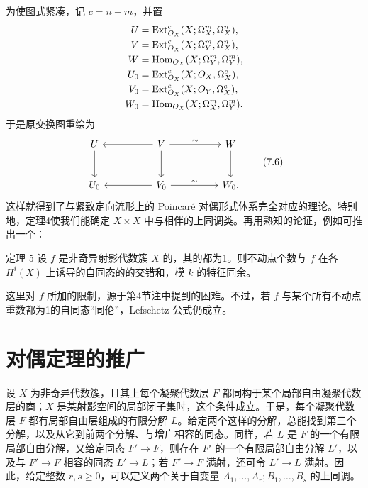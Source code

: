 为使图式紧凑，记 $c=n-m$，并置
\[
\begin{aligned}
U&=\operatorname{Ext}_{O_X}^{c}(X;\Omega_X^m,\Omega_X^n),\\
V&=\operatorname{Ext}_{O_X}^{c}(X;\Omega_Y^m,\Omega_X^n),\\
W&=\operatorname{Hom}_{O_X}(X;\Omega_Y^m,\Omega_Y^m),\\
U_0&=\operatorname{Ext}_{O_X}^{c}(X;O_X,\Omega_X^c),\\
V_0&=\operatorname{Ext}_{O_X}^{c}(X;O_Y,\Omega_X^c),\\
W_0&=\operatorname{Hom}_{O_X}(X;\Omega_X^m,\Omega_Y^m).
\end{aligned}
\]
于是原交换图重绘为
\begin{equation}
\begin{tikzcd}[column sep=huge,row sep=large]
U\arrow[d]&V\arrow[l]\arrow[r,"\sim"]\arrow[d]&W\arrow[d]\\
U_0&V_0\arrow[l]\arrow[r,"\sim"]&W_0.
\end{tikzcd}\tag{7.6}
\end{equation}
这样就得到了与紧致定向流形上的 Poincaré 对偶形式体系完全对应的理论。特别地，定理4使我们能确定 $X\times X$ 中与相伴的上同调类。再用熟知的论证，例如可推出一个：
\begin{statement}{定理 5}
设 $f$ 是非奇异射影代数簇 $X$ 的，其的都为1。则不动点个数与 $f$ 在各 $H^i(X)$ 上诱导的自同态的的交错和，模 $k$ 的特征同余。
\end{statement}
这里对 $f$ 所加的限制，源于第4节注中提到的困难。不过，若 $f$ 与某个所有不动点重数都为1的自同态“同伦”，Lefschetz 公式仍成立。

\section{对偶定理的推广}
设 $X$ 为非奇异代数簇，且其上每个凝聚代数层 $F$ 都同构于某个局部自由凝聚代数层的商；$X$ 是某射影空间的局部闭子集时，这个条件成立。于是，每个凝聚代数层 $F$ 都有局部自由层组成的有限分解 $L$。给定两个这样的分解，总能找到第三个分解，以及从它到前两个分解、与增广相容的同态。同样，若 $L$ 是 $F$ 的一个有限局部自由分解，又给定同态 $F'\to F$，则存在 $F'$ 的一个有限局部自由分解 $L'$，以及与 $F'\to F$ 相容的同态 $L'\to L$；若 $F'\to F$ 满射，还可令 $L'\to L$ 满射。因此，给定整数 $r,s\geq0$，可以定义两个关于自变量 $A_1,\ldots,A_r;B_1,\ldots,B_s$ 的上同调。

